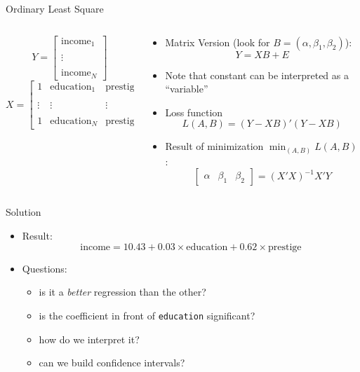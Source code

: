 \documentclass[
  ignorenonframetext,
  aspectratio=169,
]{beamer}
\providecommand{\tightlist}{%
  \setlength{\itemsep}{0pt}\setlength{\parskip}{0pt}}\usepackage{longtable,booktabs,array}
\begin{document}
\begin{frame}[fragile]
\begin{block}{Ordinary Least Square}
\protect\hypertarget{ordinary-least-square}{}
\begin{columns}[T]
\begin{column}{0.48\textwidth}
\[Y = \begin{bmatrix}
\text{income}_1 \\\\
\vdots \\\\
\text{income}_N 
\end{bmatrix}\] \[X = \begin{bmatrix}
1 & \text{education}_1 & \text{prestige}_1 \\\\
\vdots & \vdots & \vdots \\\\
1 &\text{education}_N & \text{prestige}_N
\end{bmatrix}\]
\end{column}

\begin{column}{0.48\textwidth}
\begin{itemize}
\tightlist
\item
  Matrix Version (look for
  \(B = \left( \alpha, \beta_1 , \beta_2 \right)\)): \[Y =  X B + E\]
\item
  Note that constant can be interpreted as a ``variable''
\item
  Loss function \[L(A,B) = (Y - X B)' (Y - X B)\]
\item
  Result of minimization \(\min_{(A,B)} L(A,B)\) :
  \[\begin{bmatrix}\alpha & \beta_1 & \beta_2 \end{bmatrix} = (X'X)^{-1} X' Y \]
\end{itemize}
\end{column}
\end{columns}
\end{block}

\begin{block}{Solution}
\protect\hypertarget{solution}{}
\begin{itemize}
\tightlist
\item
  Result:
  \[\text{income} = 10.43  + 0.03 \times \text{education} + 0.62 \times \text{prestige}\]
\item
  Questions:

  \begin{itemize}
  \tightlist
  \item
    is it a \emph{better} regression than the other?
  \item
    is the coefficient in front of \texttt{education} significant?
  \item
    how do we interpret it?
  \item
    can we build confidence intervals?
  \end{itemize}
\end{itemize}


\end{block}
\end{frame}
\end{document}
